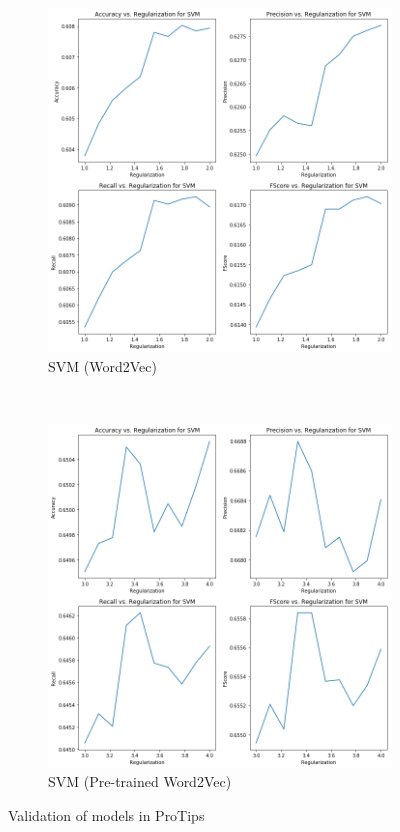 \documentclass[11pt,a4paper]{article}
\begin{document}
\begin{figure}[h!]
\begin{subfigure}[h!]{0.3\textwidth}
		\includegraphics[width=\linewidth]{plots_svm1.png}
		\caption{SVM (Word2Vec)}
		\label{fig:svm1_val}
	\end{subfigure}
	~
	\begin{subfigure}[h!]{0.3\textwidth}
		\includegraphics[width=\linewidth]{plots_svm2.png}
		\caption{SVM (Pre-trained Word2Vec)}
		\label{fig:svm2_val}
	\end{subfigure}
	\caption{Validation of models in ProTips}
	\label{fig:models_val}
\end{figure}
\end{document}
